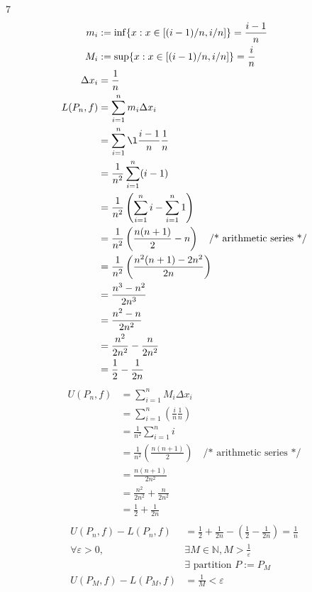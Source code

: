 \documentclass[12pt, border = 4pt, multi]{article} %
\begin{document}
\\
\\
\\
\\
\\
7
\begin{align*}
m_i &:= \inf\{x: x \in [(i - 1) / n, i / n]\} = \frac{i - 1}{n}\\
M_i &:= \sup\{x: x \in [(i - 1) / n, i / n]\} = \frac{i}{n}\\
\Delta x_i &= \frac{1}{n}\\
L(P_n, f) &= \sum_{i = 1} ^ n m_i \Delta x_i\\
&= \sum_{i = 1} ^ n \l\frac{i - 1}{n} \frac{1}{n}\\
&= \frac{1}{n ^ 2} \sum_{i = 1} ^ n (i - 1)\\
&= \frac{1}{n ^ 2}\left(\sum_{i = 1} ^ n i - \sum_{i = 1} ^ n 1\right)\\
&= \frac{1}{n ^ 2}\left(\frac{n(n + 1)}{2} - n\right) \quad \text{/* arithmetic series */}\\
&= \frac{1}{n ^ 2}\left(\frac{n ^ 2(n + 1) - 2n ^ 2}{2n}\right)\\
&= \frac{n ^ 3 - n ^ 2}{2n ^ 3}\\
&= \frac{n ^ 2 - n}{2n ^ 2}\\
&= \frac{n ^ 2}{2n ^ 2} - \frac{n}{2n ^ 2}\\
&= \frac{1}{2} - \frac{1}{2n}
\end{align*}
\begin{align*}
U(P_n, f) &= \sum_{i = 1} ^ n M_i \Delta x_i\\
&= \sum_{i = 1} ^ n \left(\frac{i}{n}\frac{1}{n}\right)\\
&= \frac{1}{n ^ 2}\sum_{i = 1} ^ n i\\
&= \frac{1}{n ^ 2}\left(\frac{n(n + 1)}{2}\right) \quad \text{/* arithmetic series */}\\
&= \frac{n(n + 1)}{2n ^ 2}\\
&= \frac{n ^ 2}{2n ^ 2} + \frac{n}{2n ^ 2}\\
&= \frac{1}{2} + \frac{1}{2n}\\
\end{align*}
\begin{align*}
U(P_n, f) - L(P_n, f) &= \frac{1}{2} + \frac{1}{2n} - \left(\frac{1}{2} - \frac{1}{2n}\right) = \frac{1}{n}\\
\forall \varepsilon > 0, &\exists M \in \mathbb{N}, M > \frac{1}{\varepsilon}\\
&\exists \text{ partition } P := P_M\\
U(P_M, f) - L(P_M, f) &= \frac{1}{M} < \varepsilon
\end{align*}
\end{document}
